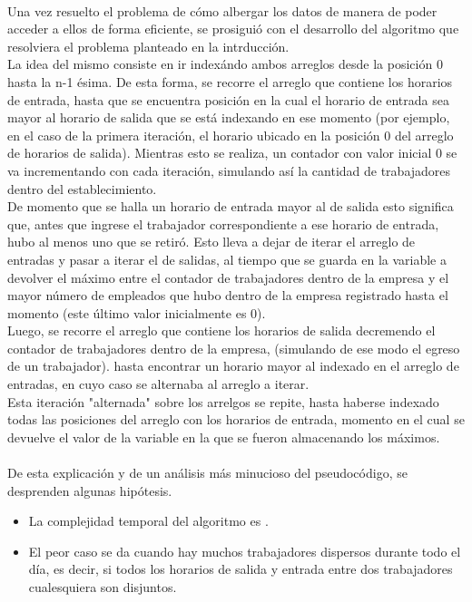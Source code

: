 \paragraph{}
Una vez resuelto el problema de cómo albergar los datos de manera de poder acceder a ellos de forma eficiente, se prosiguió con el desarrollo del algoritmo que resolviera el problema planteado en la intrducci\'on. \\
La idea del mismo consiste en ir index\'ando ambos arreglos desde la posici\'on 0 hasta la n-1 \'esima. De esta forma, se recorre el arreglo que contiene los horarios de entrada, hasta que se encuentra posici\'on en la cual el horario de entrada sea mayor al horario de salida que se est\'a indexando en ese momento (por ejemplo, en el caso de la primera iteraci\'on, el horario ubicado en la posici\'on 0 del arreglo de horarios de salida). Mientras esto se realiza, un contador con valor inicial 0 se va incrementando con cada iteraci\'on, simulando as\'i la cantidad de trabajadores dentro del establecimiento.\\
De momento que se halla un horario de entrada mayor al de salida esto significa que, antes que ingrese el trabajador correspondiente a ese horario de entrada, hubo al menos uno que se retir\'o. Esto lleva a dejar de iterar el arreglo de entradas y pasar a iterar el de salidas, al tiempo que se guarda en la variable a devolver el máximo entre el contador de trabajadores dentro de la empresa y el mayor n\'umero de empleados que hubo dentro de la empresa registrado hasta el momento (este \'ultimo valor inicialmente es 0). \\
Luego, se recorre el arreglo que contiene los horarios de salida decremendo el contador de trabajadores dentro de la empresa, (simulando de ese modo el egreso de un trabajador). hasta encontrar un horario mayor al indexado en el arreglo de entradas, en cuyo caso se alternaba al arreglo a iterar.\\
Esta iteraci\'on "alternada" sobre los arrelgos se repite, hasta haberse indexado todas las posiciones del arreglo con los horarios de entrada, momento en el cual se devuelve el valor de la variable en la que se fueron almacenando los m\'aximos.

\paragraph{}
De esta explicación y de un análisis más minucioso del pseudocódigo, se desprenden algunas hipótesis.
\begin{itemize}
	\item La complejidad temporal del algoritmo es .
	\item El peor caso se da cuando hay muchos trabajadores dispersos durante todo el día, es decir, si todos los horarios de salida y entrada entre dos trabajadores cualesquiera son disjuntos.
\end{itemize}

